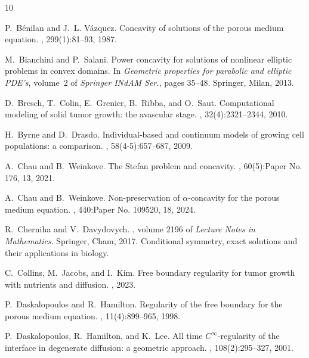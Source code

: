 \documentclass[10pt]{article}         %
\numberwithin{equation}{section}
\begin{document}
\begin{thebibliography}{10}

P.~B\'enilan and J.~L. V\'azquez.
\newblock Concavity of solutions of the porous medium equation.
, 299(1):81--93, 1987.

M.~Bianchini and P.~Salani.
\newblock Power concavity for solutions of nonlinear elliptic problems in
  convex domains.
\newblock In {\em Geometric properties for parabolic and elliptic {PDE}'s},
  volume~2 of {\em Springer INdAM Ser.}, pages 35--48. Springer, Milan, 2013.

D.~Bresch, T.~Colin, E.~Grenier, B.~Ribba, and O.~Saut.
\newblock Computational modeling of solid tumor growth: the avascular stage.
, 32(4):2321--2344, 2010.

H.~Byrne and D.~Drasdo.
\newblock Individual-based and continuum models of growing cell populations: a
  comparison.
, 58(4-5):657--687, 2009.

A.~Chau and B.~Weinkove.
\newblock The {S}tefan problem and concavity.
, 60(5):Paper No. 176,
  13, 2021.

A.~Chau and B.~Weinkove.
\newblock Non-preservation of {\it {$\alpha $}}-concavity for the porous medium
  equation.
, 440:Paper No. 109520, 18, 2024.

R.~Cherniha and V.~Davydovych.
, volume 2196 of {\em
  Lecture Notes in Mathematics}.
\newblock Springer, Cham, 2017.
\newblock Conditional symmetry, exact solutions and their applications in
  biology.

C.~Collins, M.~Jacobs, and I.~Kim.
\newblock Free boundary regularity for tumor growth with nutrients and
  diffusion.
, 2023.

P.~Daskalopoulos and R.~Hamilton.
\newblock Regularity of the free boundary for the porous medium equation.
, 11(4):899--965, 1998.

P.~Daskalopoulos, R.~Hamilton, and K.~Lee.
\newblock All time {$C^\infty$}-regularity of the interface in degenerate
  diffusion: a geometric approach.
, 108(2):295--327, 2001.


\end{thebibliography}
\end{document}
